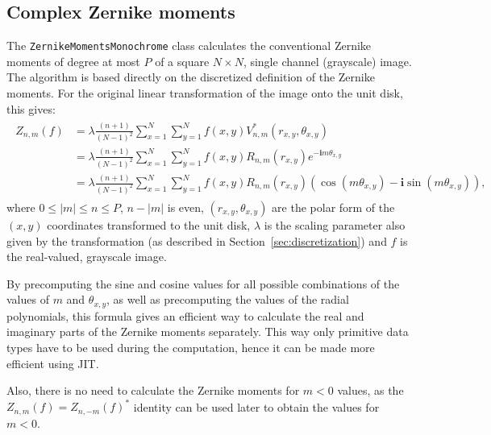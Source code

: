 \subsection{Complex Zernike moments}
The \texttt{ZernikeMomentsMonochrome} class calculates the conventional Zernike moments of degree at most $P$ of a square $N \times N$, single channel (grayscale) image. The algorithm is based directly on the discretized definition of the Zernike moments.
For the original linear transformation of the image onto the unit disk, this gives:
\begin{gather*}
    \begin{split}
    Z_{n,m}(f) &= \lambda\frac{(n+1)}{(N-1)^2}\sum_{x=1}^{N}\sum_{y=1}^{N}f(x,y)V_{n,m}^{*}(r_{x,y},\theta_{x,y}) \\
    &= \lambda\frac{(n+1)}{(N-1)^2}\sum_{x=1}^{N}\sum_{y=1}^{N}f(x,y)R_{n,m}(r_{x,y})e^{-\bm{i}m\theta_{x,y}} \\
    &= \lambda\frac{(n+1)}{(N-1)^2}\sum_{x=1}^{N}\sum_{y=1}^{N}f(x,y)R_{n,m}(r_{x,y})(\cos (m\theta_{x,y}) - \bm{i}\sin (m\theta_{x,y})),
    \end{split}
\end{gather*}
where $0\leq |m| \leq n \leq P$, $n - |m|$ is even, $(r_{x,y},\theta_{x,y})$ are the polar form of the $(x,y)$ coordinates transformed to the unit disk, $\lambda$ is the scaling parameter also given by the transformation (as described in Section~\ref{sec:discretization}) and $f$ is the real-valued, grayscale image.

By precomputing the sine and cosine values for all possible combinations of the values of $m$ and $\theta_{x,y}$, as well as precomputing the values of the radial polynomials, this formula gives an efficient way to calculate the real and imaginary parts of the Zernike moments separately. This way only primitive data types have to be used during the computation, hence it can be made more efficient using JIT.

Also, there is no need to calculate the Zernike moments for $m < 0$ values, as the $Z_{n,m}(f) = Z_{n,-m}(f)^{*}$ identity can be used later to obtain the values for $m < 0$.

